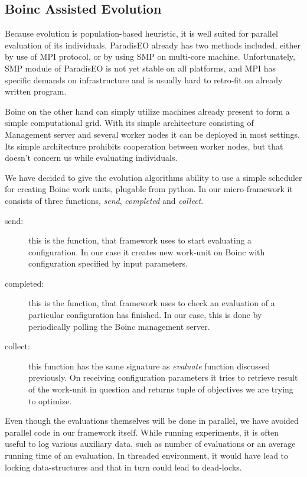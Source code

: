 \documentclass[12pt,oneside]{fithesis2}
\begin{document}
\subsection{Boinc Assisted Evolution}
Because evolution is population-based heuristic, it is well suited for parallel evaluation of its individuals. ParadisEO already has two methods included, either by use of MPI protocol, or by using SMP on multi-core machine\cite{liefooghe2007Paradiseo}. Unfortunately, SMP module of ParadisEO is not yet stable on all platforms, and MPI has specific demands on infrastructure and is usually hard to retro-fit on already written program. 


Boinc on the other hand  can simply utilize machines already present to form a simple computational grid. With its simple architecture consisting of Management server and several worker nodes it can be deployed in most settings. Its simple architecture prohibits cooperation between worker nodes, but that doesn't concern us while evaluating individuals.

We have decided to give the evolution algorithms ability to use a simple scheduler for creating Boinc work units, plugable from python. In our micro-framework it consists of three functions, \emph{send}, \emph{completed} and \emph{collect}.

\begin{description}
\item[send:] this is the function, that framework uses to start evaluating a configuration. In our case it creates new work-unit on Boinc with configuration specified by input parameters.
\item[completed:] this is the function, that framework uses to check an evaluation of a particular configuration has finished. In our case, this is done by periodically polling the Boinc management server.
\item[collect:] this function has the same signature as \emph{evaluate} function discussed previously. On receiving configuration parameters it tries to retrieve result of the work-unit in question and returns tuple of objectives we are trying to optimize.
\end{description}

Even though the evaluations themselves will be done in parallel, we have avoided parallel code in our framework itself. While running experiments, it is often useful to log various auxiliary data, such as number of evaluations or an average running time of an evaluation. In threaded environment, it would have lead to locking data-structures and that in turn could lead to dead-locks.
\end{document}
